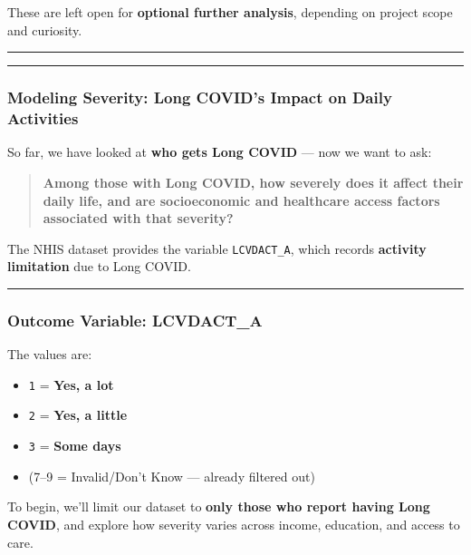 \documentclass[
]{article}
\providecommand{\tightlist}{%
  \setlength{\itemsep}{0pt}\setlength{\parskip}{0pt}}
\begin{document}
These are left open for \textbf{optional further analysis}, depending on
project scope and curiosity.

\begin{center}\rule{0.5\linewidth}{0.5pt}\end{center}

\begin{center}\rule{0.5\linewidth}{0.5pt}\end{center}

\subsubsection{Modeling Severity: Long COVID's Impact on Daily
Activities}\label{modeling-severity-long-covids-impact-on-daily-activities}

So far, we have looked at \textbf{who gets Long COVID} --- now we want
to ask:

\begin{quote}
\textbf{Among those with Long COVID, how severely does it affect their
daily life, and are socioeconomic and healthcare access factors
associated with that severity?}
\end{quote}

The NHIS dataset provides the variable \texttt{LCVDACT\_A}, which
records \textbf{activity limitation} due to Long COVID.

\begin{center}\rule{0.5\linewidth}{0.5pt}\end{center}

\subsubsection{Outcome Variable:
LCVDACT\_A}\label{outcome-variable-lcvdact_a}

The values are:

\begin{itemize}
\tightlist
\item
  \texttt{1} = \textbf{Yes, a lot}
\item
  \texttt{2} = \textbf{Yes, a little}
\item
  \texttt{3} = \textbf{Some days}
\item
  (7--9 = Invalid/Don't Know --- already filtered out)
\end{itemize}

To begin, we'll limit our dataset to \textbf{only those who report
having Long COVID}, and explore how severity varies across income,
education, and access to care.
\end{document}
